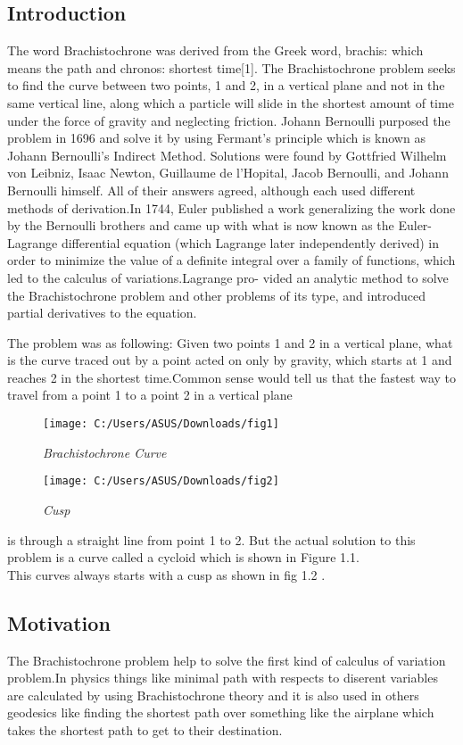 \documentclass[10pt,a4paper]{article}
\begin{document}
\begin{flushleft}
	\subsection{Introduction}

	The word Brachistochrone was derived from the Greek word, brachis: which means the
	path and chronos: shortest time[1]. The Brachistochrone problem seeks to find the curve
	between two points, 1 and 2, in a vertical plane and not in the same vertical line, along
	which a particle will slide in the shortest amount of time under the force of gravity and
	neglecting friction. 
	Johann Bernoulli purposed the problem in 1696 and solve it by using Fermant’s principle
	which is known as Johann Bernoulli’s Indirect Method. Solutions were found by Gottfried
	Wilhelm von Leibniz, Isaac Newton, Guillaume de l’Hopital, Jacob Bernoulli, and Johann
	Bernoulli himself. All of their answers agreed, although each used different methods of
	derivation.In 1744, Euler published a work generalizing the work done by the Bernoulli
	brothers and came up with what is now known as the Euler-Lagrange differential equation
	(which Lagrange later independently derived) in order to minimize the value of a definite integral over a family of functions, which led to the calculus of variations.Lagrange pro-
	vided an analytic method to solve the Brachistochrone problem and other problems of its type, and introduced partial derivatives to the equation.
	
	The problem was as following:
	Given two points 1 and 2 in a vertical plane, what is the curve traced out by a point acted on only by gravity, which starts at 1 and reaches 2 in the shortest time.Common sense would tell us that the fastest way to travel from a point 1 to a point 2 in a vertical plane
	\newpage
	\begin{figure}[t]
		\centering
		\texttt{[image: C:/Users/ASUS/Downloads/fig1]}
		\caption{\textit{Brachistochrone Curve}}
		\texttt{[image: C:/Users/ASUS/Downloads/fig2]}
		\caption{\textit{Cusp}}
	\end{figure}
	is through a straight line from point 1 to 2. But the actual solution to this problem is a
	curve called a cycloid which is shown in Figure 1.1.\\
	\vspace{1 cm}
	This curves always starts with a cusp as shown in fig 1.2 .
	
	\subsection{Motivation}
	The Brachistochrone problem help to solve the first kind of calculus of variation problem.In physics things like minimal path with respects to diserent variables are calculated by using Brachistochrone theory and it is also used in others geodesics like finding the shortest path over something like the airplane which takes the shortest path to get to their destination.
	\newpage

\end{flushleft}
\end{document}
